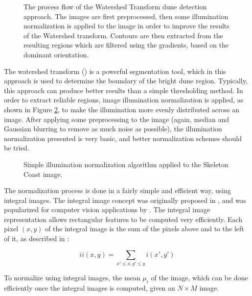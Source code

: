  \begin{figure}[H]
 	\centering
 	\caption{The process flow of the Watershed Transform dune detection approach. The images are first preprocessed, then some illumination normalization is applied to the image in order to improve the results of the Watershed transform. Contours are then extracted from the resulting regions which are filtered using the gradients, based on the dominant orientation. }
 	\label{fig:flow_watershed}
 \end{figure}
 
  The watershed transform (\cite{2014_priority_flood,1979_workshop_image_processing,1994_watershed_continuous_function}) is a powerful segmentation tool, which in this approach is used to determine the boundary of the bright dune region. Typically, this approach can produce better results than a simple thresholding method. In order to extract reliable regions, image illumination normalization is applied, as shown in Figure \ref{fig:illumination_normalization}, to make the illumination more evenly distributed across an image. After applying some preprocessing to the image (again, median and Gaussian blurring to remove as much noise as possible), the illumination normalization presented is very basic, and better normalization schemes should be tried.

\begin{figure}
	\centering
	\caption{Simple illumination normalization algorithm applied to the Skeleton Coast image.}
	\label{fig:illumination_normalization}
\end{figure}

The normalization process is done in a fairly simple and efficient way, using integral images. The integral image concept was originally proposed in \cite{Summed-area-tables-for-texture-mapping}, and was popularized for computer vision applications by \cite{Robust-real-time-Object-Detection}. The integral image representation allows rectangular features to be computed very efficiently. Each pixel $(x,y)$ of the integral image is the sum of the pixels above and to the left of it, as described in \cite{Robust-real-time-Object-Detection}:

\begin{equation}
ii\left(x,y\right)=\sum_{x'\leq x,y'\leq y}i\left(x',y'\right)
\end{equation}

To normalize using integral images, the mean $\mu_{i}$ of the image, which can be done efficiently once the integral images is computed, given an $N\times M$ image.

